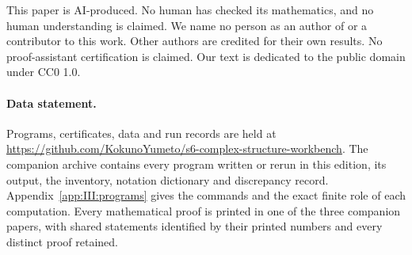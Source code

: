 This paper is AI-produced. No human has checked its mathematics, and no
human understanding is claimed. We name no person as an author of or a
contributor to this work. Other authors are credited for their own results.
No proof-assistant certification is claimed. Our text is dedicated to the
public domain under CC0 1.0.

\paragraph{Data statement.}
Programs, certificates, data and run records are held at
\url{https://github.com/KokunoYumeto/s6-complex-structure-workbench}.
The companion archive contains every program written or rerun in this
edition, its output, the inventory, notation dictionary and discrepancy
record. Appendix~\ref{app:III:programs} gives the commands and the exact
finite role of each computation. Every mathematical proof is printed in
one of the three companion papers, with shared statements identified by
their printed numbers and every distinct proof retained.



